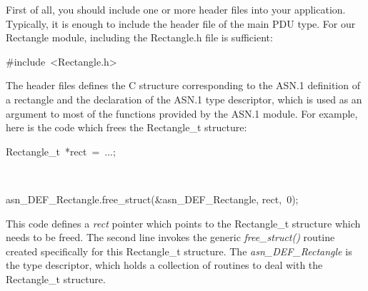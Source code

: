 \documentclass[english,oneside,12pt]{book}
\newenvironment{lyxcode}
{\par\begin{list}{}{
\setlength{\rightmargin}{\leftmargin}
\setlength{\listparindent}{0pt}%
\raggedright
\setlength{\itemsep}{0pt}
\setlength{\parsep}{0pt}
\normalfont\ttfamily}%
 \item[]}
{\end{list}}
\begin{document}
First of all, you should include one or more header files into your
application. Typically, it is enough to include the header file of
the main PDU type. For our Rectangle module, including the Rectangle.h
file is sufficient:
\begin{lyxcode}
\#include~<Rectangle.h>
\end{lyxcode}
The header files defines the C structure corresponding to the ASN.1
definition of a rectangle and the declaration of the ASN.1 type descriptor,
which is used as an argument to most of the functions provided by
the ASN.1 module. For example, here is the code which frees the Rectangle\_t
structure:
\begin{lyxcode}
Rectangle\_t~{*}rect~=~...;

~

asn\_DEF\_Rectangle.free\_struct(\&asn\_DEF\_Rectangle, rect,~0);
\end{lyxcode}
This code defines a \emph{rect} pointer which points to the Rectangle\_t
structure which needs to be freed. The second line invokes the generic
\emph{free\_struct()} routine created specifically for this Rectangle\_t
structure. The \emph{asn\_DEF\_Rectangle} is the type descriptor,
which holds a collection of routines to deal with the Rectangle\_t
structure.
\end{document}
